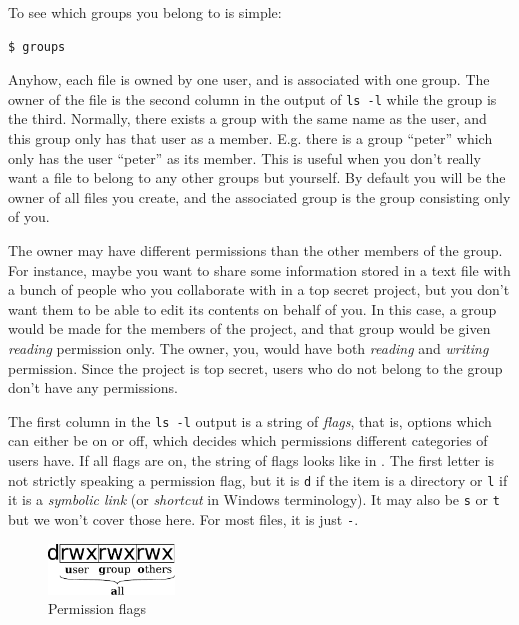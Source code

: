 To see which groups you belong to is simple:

\begin{verbatim}
$ groups
\end{verbatim}

Anyhow, each file is owned by one user, and is associated with one group. The owner of the file is the second column in the output of \verb|ls -l| while the group is the third. Normally, there exists a group with the same name as the user, and this group only has that user as a member. E.g. there is a group ``peter'' which only has the user ``peter'' as its member. This is useful when you don't really want a file to belong to any other groups but yourself. By default you will be the owner of all files you create, and the associated group is the group consisting only of you.

The owner may have different permissions than the other members of the group. For instance, maybe you want to share some information stored in a text file with a bunch of people who you collaborate with in a top secret project, but you don't want them to be able to edit its contents on behalf of you. In this case, a group would be made for the members of the project, and that group would be given \emph{reading} permission only. The owner, you, would have both \emph{reading} and \emph{writing} permission. Since the project is top secret, users who do not belong to the group don't have any permissions.

The first column in the \verb|ls -l| output is a string of \emph{flags}, that is, options which can either be on or off, which decides which permissions different categories of users have. If all flags are on, the string of flags looks like in . The first letter is not strictly speaking a permission flag, but it is \verb|d| if the item is a directory or \verb|l| if it is a \emph{symbolic link} (or \emph{shortcut} in Windows terminology). It may also be \verb|s| or \verb|t| but we won't cover those here. For most files, it is just \verb|-|.

\begin{figure}
	\centering
	\includegraphics[width=0.3\textwidth]{graphics/permissions.pdf}
	\caption{Permission flags}
	\label{fig:bash:permissions}
\end{figure}

